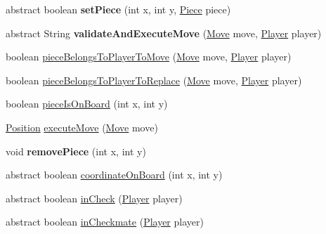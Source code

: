 \begin{DoxyCompactItemize}
\item 
\hypertarget{classmodel_1_1board_1_1_board_a520ffa2d6ca956b0137d1e7841cf3e10}{abstract boolean {\bfseries set\-Piece} (int x, int y, \hyperlink{classmodel_1_1piece_1_1_piece}{Piece} piece)}\label{classmodel_1_1board_1_1_board_a520ffa2d6ca956b0137d1e7841cf3e10}

\item 
\hypertarget{classmodel_1_1board_1_1_board_a3d0852d2482ad9a3e581d644b8b3d52d}{abstract String {\bfseries validate\-And\-Execute\-Move} (\hyperlink{classmodel_1_1_move}{Move} move, \hyperlink{classmodel_1_1player_1_1_player}{Player} player)}\label{classmodel_1_1board_1_1_board_a3d0852d2482ad9a3e581d644b8b3d52d}

\item 
boolean \hyperlink{classmodel_1_1board_1_1_board_a25524102795e56cb1e51ae50e0975230}{piece\-Belongs\-To\-Player\-To\-Move} (\hyperlink{classmodel_1_1_move}{Move} move, \hyperlink{classmodel_1_1player_1_1_player}{Player} player)
\item 
boolean \hyperlink{classmodel_1_1board_1_1_board_a1aaad68031edc96bc28b5ac2dca9c4e6}{piece\-Belongs\-To\-Player\-To\-Replace} (\hyperlink{classmodel_1_1_move}{Move} move, \hyperlink{classmodel_1_1player_1_1_player}{Player} player)
\item 
boolean \hyperlink{classmodel_1_1board_1_1_board_a2d92dbb7ef019dacc5a3e7c6cca2ac88}{piece\-Is\-On\-Board} (int x, int y)
\item 
\hyperlink{classmodel_1_1_position}{Position} \hyperlink{classmodel_1_1board_1_1_board_a072a1a10d257f6b85b0c860fdb88830a}{execute\-Move} (\hyperlink{classmodel_1_1_move}{Move} move)
\item 
\hypertarget{classmodel_1_1board_1_1_board_a82ad5e04b8495408a84288410d92eb65}{void {\bfseries remove\-Piece} (int x, int y)}\label{classmodel_1_1board_1_1_board_a82ad5e04b8495408a84288410d92eb65}

\item 
abstract boolean \hyperlink{classmodel_1_1board_1_1_board_ac7d7654faa69c9bde6de7bf9d8f7f1fe}{coordinate\-On\-Board} (int x, int y)
\item 
abstract boolean \hyperlink{classmodel_1_1board_1_1_board_ac3b426f656139555b5bc6a2c1e35cf99}{in\-Check} (\hyperlink{classmodel_1_1player_1_1_player}{Player} player)
\item 
abstract boolean \hyperlink{classmodel_1_1board_1_1_board_a7640ad17b1574b8f013b7212ea01b3ec}{in\-Checkmate} (\hyperlink{classmodel_1_1player_1_1_player}{Player} player)
\end{DoxyCompactItemize}
